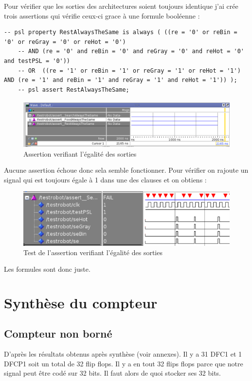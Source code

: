 \documentclass{article}
\begin{document}
Pour vérifier que les sorties des architectures soient toujours identique j'ai crée trois assertions qui vérifie ceux-ci grace à une formule booléenne :

\begin{verbatim}
-- psl property RestAlwaysTheSame is always ( ((re = '0' or reBin = '0' or reGray = '0' or reHot = '0') 
	-- AND (re = '0' and reBin = '0' and reGray = '0' and reHot = '0' and testPSL = '0'))
	-- OR  ((re = '1' or reBin = '1' or reGray = '1' or reHot = '1') AND (re = '1' and reBin = '1' and reGray = '1' and reHot = '1')) );
	-- psl assert RestAlwaysTheSame;
\end{verbatim}

\begin{figure}[!h]
\centering
\includegraphics[scale=0.6]{D/testOK.PNG}
\caption{Assertion verifiant l'égalité des sorties}
\end{figure}
Aucune assertion échoue donc sela semble fonctionner.
Pour vérifier on rajoute un signal qui est toujours égale à 1 dans une des clauses et on obtiens :

\begin{figure}[!h]
\centering
\includegraphics[scale=0.6]{D/testFAIL.PNG}
\caption{Test de l'assertion verifiant l'égalité des sorties }
\end{figure}
Les formules sont donc juste.
\newpage

\section{Synthèse du compteur}
\subsection{Compteur non borné}
D'après les résultats obtenus après synthèse (voir annexes). Il y a 31 DFC1 et 1 DFCP1 soit un total de 32 flip flops. Il y a en tout 32 flips flops parce que notre signal peut être codé sur 32 bits. Il faut alors de quoi stocker ses 32 bits.
\end{document}
